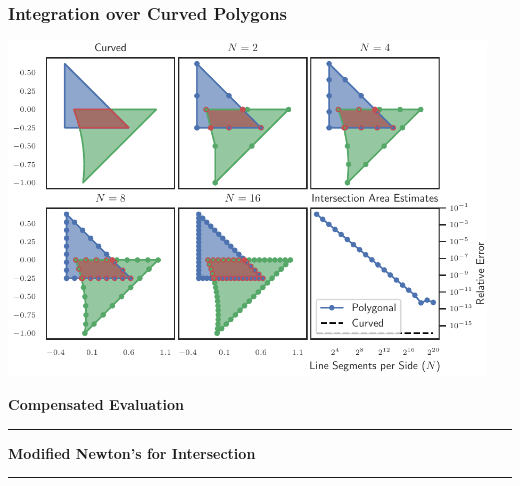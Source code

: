 \documentclass{beamer}
\begin{document}
\begin{frame}
\frametitle{Integration over Curved Polygons}
\begin{center}
\includegraphics[width=0.95\textwidth]
  {../images/solution-transfer/polygon_vs_curved_intersection.pdf}
\end{center}
\end{frame}


\begin{frame}
\centering
{\Large \bf Compensated Evaluation}
\rule{0.82\textwidth}{1pt}
\end{frame}


\begin{frame}
\centering
{\Large \bf Modified Newton's for Intersection}
\rule{0.82\textwidth}{1pt}
\end{frame}
\end{document}
